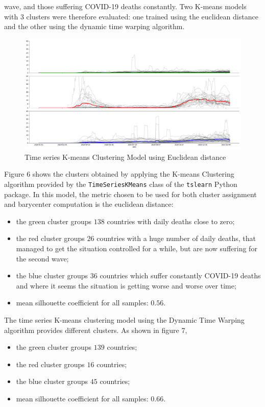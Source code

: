 \documentclass[11pt,a4paper]{article}
\begin{document}
wave, and those suffering COVID-19 deaths constantly. Two K-means models with
3 clusters were therefore evaluated: one trained using the euclidean distance
and the other using the dynamic time warping algorithm.
\begin{figure}[H]
    \begin{center}
        \includegraphics[scale=0.32]{img/daily-deaths-euclidean-clusters.pdf}
    \end{center}
    \caption{Time series K-means Clustering Model using Euclidean distance}
\end{figure}
\noindent Figure 6 shows the clusters obtained by applying the K-means
Clustering algorithm provided by the \texttt{TimeSeriesKMeans} class of the
\texttt{tslearn} Python package. In this model, the metric chosen to be used for
both cluster assignment and barycenter computation is the euclidean distance:
\begin{itemize}
    \item the {\color{ForestGreen}green cluster} groups $138$ countries with
    daily deaths close to zero;
    \item the {\color{red}red cluster} groups $26$ countries with a huge number
    of daily deaths, that managed to get the situation controlled for a while,
    but are now suffering for the second wave;
    \item the {\color{blue}blue cluster} groups $36$ countries which suffer
    constantly COVID-19 deaths and where it seems the situation is getting worse
    and worse over time;
    \item mean silhouette coefficient for all samples: $0.56$.
\end{itemize}
The time series K-means clustering model using the Dynamic Time Warping
algorithm provides different clusters. As shown in figure 7,
\begin{itemize}
    \item the {\color{ForestGreen}green cluster} groups $139$ countries;
    \item the {\color{red}red cluster} groups $16$ countries;
    \item the {\color{blue}blue cluster} groups $45$ countries;
    \item mean silhouette coefficient for all samples: $0.66$.
\end{itemize}
\end{document}
